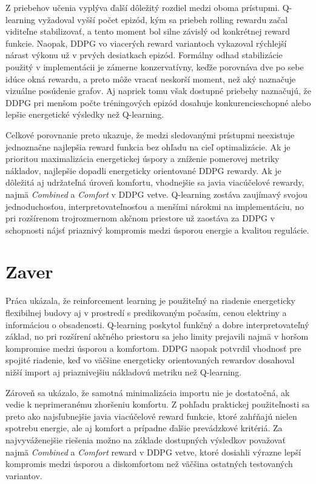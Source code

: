 \documentclass[conference]{IEEEtran}
\begin{document}
Z priebehov učenia vyplýva ďalší dôležitý rozdiel medzi oboma prístupmi. Q-learning vyžadoval vyšší počet epizód, kým sa priebeh rolling rewardu začal viditeľne stabilizovať, a tento moment bol silne závislý od konkrétnej reward funkcie. Naopak, DDPG vo viacerých reward variantoch vykazoval rýchlejší nárast výkonu už v prvých desiatkach epizód. Formálny odhad stabilizácie použitý v implementácii je zámerne konzervatívny, keďže porovnáva dve po sebe idúce okná rewardu, a preto môže vracať neskorší moment, než aký naznačuje vizuálne posúdenie grafov. Aj napriek tomu však dostupné priebehy naznačujú, že DDPG pri menšom počte tréningových epizód dosahuje konkurencieschopné alebo lepšie energetické výsledky než Q-learning.

Celkové porovnanie preto ukazuje, že medzi sledovanými prístupmi neexistuje jednoznačne najlepšia reward funkcia bez ohľadu na cieľ optimalizácie. Ak je prioritou maximalizácia energetickej úspory a zníženie pomerovej metriky nákladov, najlepšie dopadli energeticky orientované DDPG rewardy. Ak je dôležitá aj udržateľná úroveň komfortu, vhodnejšie sa javia viacúčelové rewardy, najmä \textit{Combined} a \textit{Comfort} v DDPG vetve. Q-learning zostáva zaujímavý svojou jednoduchosťou, interpretovateľnosťou a menšími nárokmi na implementáciu, no pri rozšírenom trojrozmernom akčnom priestore už zaostáva za DDPG v schopnosti nájsť priaznivý kompromis medzi úsporou energie a kvalitou regulácie.

\section{Zaver}

Práca ukázala, že reinforcement learning je použiteľný na riadenie energeticky flexibilnej budovy aj v prostredí s predikovaným počasím, cenou elektriny a informáciou o obsadenosti. Q-learning poskytol funkčný a dobre interpretovateľný základ, no pri rozšírení akčného priestoru sa jeho limity prejavili najmä v horšom kompromise medzi úsporou a komfortom. DDPG naopak potvrdil vhodnosť pre spojité riadenie, keď vo väčšine energeticky orientovaných rewardov dosahoval nižší import aj priaznivejšiu nákladovú metriku než Q-learning.

Zároveň sa ukázalo, že samotná minimalizácia importu nie je dostatočná, ak vedie k neprimeranému zhoršeniu komfortu. Z pohľadu praktickej použiteľnosti sa preto ako najsľubnejšie javia viacúčelové reward funkcie, ktoré zahŕňajú nielen spotrebu energie, ale aj komfort a prípadne ďalšie prevádzkové kritériá. Za najvyváženejšie riešenia možno na základe dostupných výsledkov považovať najmä \textit{Combined} a \textit{Comfort} reward v DDPG vetve, ktoré dosiahli výrazne lepší kompromis medzi úsporou a diskomfortom než väčšina ostatných testovaných variantov.
\end{document}
